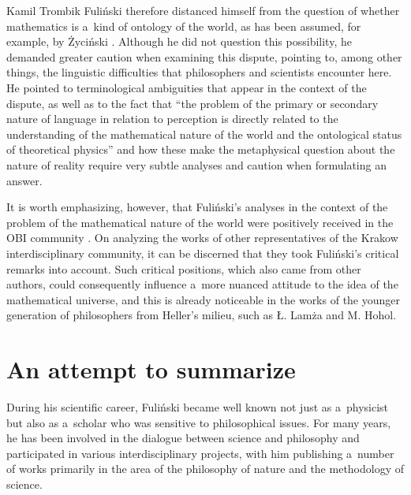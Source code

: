 \begin{artengenv}{Kamil Trombik}
Fuliński therefore distanced himself from the question of whether mathematics is a~kind of ontology of the world, as has been assumed, for example, by Życiński 
\parencite*[][]{zycinski_swiat_2013}. %
 Although he did not question this possibility, he demanded greater caution when examining this dispute, pointing to, among other things, the linguistic difficulties that philosophers and scientists encounter here. He pointed to terminological ambiguities that appear in the context of the dispute, as well as to the fact that ``the problem of the primary or secondary nature of language in relation to perception is directly related to the understanding of the mathematical nature of the world and the ontological status of theoretical physics''
\parencites[][p.65]{janik_glos_1988}[see also][p.81]{heller_co_1991} %
 and how these make the metaphysical question about the nature of reality require very subtle analyses and caution when formulating an answer.



It is worth emphasizing, however, that Fuliński's analyses in the context of the problem of the mathematical nature of the world were positively received in the OBI community 
\parencite[e.g][pp.217–218]{zycinski_teizm_1988}. %
 On analyzing the works of other representatives of the Krakow interdisciplinary community, it can be discerned that they took Fuliński's critical remarks into account. Such critical positions, which also came from other authors, could consequently influence a~more nuanced attitude to the idea of the mathematical universe, and this is already noticeable in the works of the younger generation of philosophers from Heller's milieu, such as Ł. Lamża and M. Hohol.



\section*{An attempt to summarize}

During his scientific career, Fuliński became well known not just as a~physicist but also as a~scholar who was sensitive to philosophical issues. For many years, he has been involved in the dialogue between science and philosophy and participated in various interdisciplinary projects, with him publishing a~number of works primarily in the area of the philosophy of nature and the methodology of science.




\end{artengenv}

